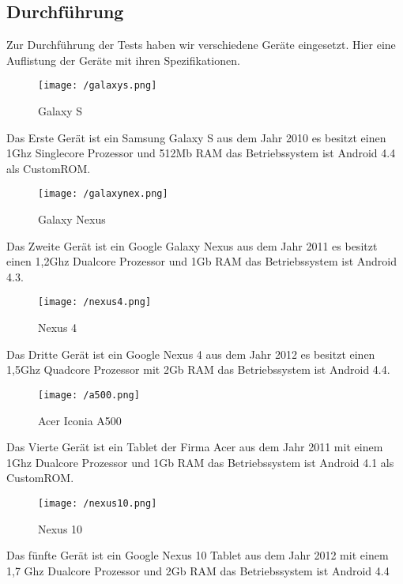 \newpage

\subsection{Durchführung} 

Zur Durchführung der Tests haben wir verschiedene Geräte eingesetzt. Hier eine Auflistung der Geräte mit ihren Spezifikationen.

\begin{figure}[H]
\centering
\texttt{[image: /galaxys.png]}
\caption{Galaxy S}
\label{fig:galaxy S}
\end{figure}

Das Erste Gerät ist ein Samsung Galaxy S aus dem Jahr 2010 es besitzt einen 1Ghz Singlecore Prozessor und 512Mb RAM das Betriebssystem ist Android 4.4 als CustomROM.\\

\begin{figure}[H]
\centering
\texttt{[image: /galaxynex.png]}
\caption{Galaxy Nexus}
\label{fig:galaxynex}
\end{figure}

Das Zweite Gerät ist ein Google Galaxy Nexus aus dem Jahr 2011 es besitzt einen 1,2Ghz Dualcore Prozessor und 1Gb RAM das Betriebssystem ist Android 4.3.\\

\begin{figure}[H]
\centering
\texttt{[image: /nexus4.png]}
\caption{Nexus 4}
\label{fig:nexus4}
\end{figure}

Das Dritte Gerät ist ein Google Nexus 4 aus dem Jahr 2012 es besitzt einen 1,5Ghz Quadcore Prozessor mit 2Gb RAM das Betriebssystem  ist Android 4.4.\\

\begin{figure}[H]
\centering
\texttt{[image: /a500.png]}
\caption{Acer Iconia A500}
\label{fig:a500}
\end{figure}

Das Vierte Gerät ist ein Tablet der Firma Acer aus dem Jahr 2011 mit einem 1Ghz Dualcore Prozessor und 1Gb RAM das Betriebssystem ist Android 4.1 als CustomROM.\\

\begin{figure}[H]
\centering
\texttt{[image: /nexus10.png]}
\caption{Nexus 10}
\label{fig:nexus10}
\end{figure}

Das fünfte Gerät ist ein Google Nexus 10 Tablet aus dem Jahr 2012 mit einem 1,7 Ghz Dualcore Prozessor und 2Gb RAM das Betriebssystem ist Android 4.4\\

